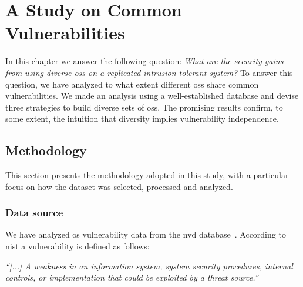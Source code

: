 \chapter{A Study on Common Vulnerabilities}
\label{chap:datasource}

In this chapter we answer the following question: \emph{What are the security gains from using diverse \glspl{os} on a replicated intrusion-tolerant system?}
To answer this question, we have analyzed to what extent different \glspl{os} share common vulnerabilities.
We made an analysis using a well-established database and devise three strategies to build diverse sets of \glspl{os}.
The promising results confirm, to some extent, the intuition that diversity implies vulnerability independence.

\section{Methodology}

This section presents the methodology adopted in this study, with a particular focus on how the dataset was selected, processed and analyzed.


\subsection{Data source}
We have analyzed \gls{os} vulnerability data from the \gls{nvd} database~\cite{nvd}. 
According to \gls{nist} a vulnerability is defined as follows:

\begin{defn}
 \emph{``[...] A weakness in an information system, system security procedures, internal controls, or implementation that could be exploited by a threat source.''}~\cite{Nist:2012}
\end{defn}



